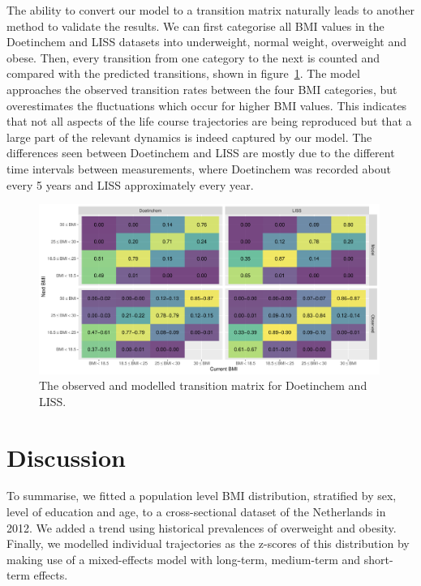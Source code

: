 \documentclass{imammb}
\numberwithin{equation}{section}
\begin{document}
The ability to convert our model to a transition matrix naturally leads to another method to validate the results. We can first categorise all BMI values in the Doetinchem and LISS datasets into underweight, normal weight, overweight and obese. Then, every transition from one category to the next is counted and compared with the predicted transitions, shown in figure~\ref{fig:Transition Matrices}. The model approaches the observed transition rates between the four BMI categories, but overestimates the fluctuations which occur for higher BMI values. This indicates that not all aspects of the life course trajectories are being reproduced but that a large part of the relevant dynamics is indeed captured by our model. The differences seen between Doetinchem and LISS are mostly due to the different time intervals between measurements, where Doetinchem was recorded about every 5 years and LISS approximately every year.

\vspace{-4mm}

\begin{figure}[!h]
\centering\includegraphics[width=0.99\textwidth] {"Figures/Transition Matrices.pdf"}
\caption{The observed and modelled transition matrix for Doetinchem and LISS.}
\label{fig:Transition Matrices}
\vspace*{-9pt}
\end{figure}

\section{Discussion}
\label{sec:Discussion}

To summarise, we fitted a population level BMI distribution, stratified by sex, level of education and age, to a cross-sectional dataset of the Netherlands in 2012. We added a trend using historical prevalences of overweight and obesity. Finally, we modelled individual trajectories as the z-scores of this distribution by making use of a mixed-effects model with long-term, medium-term and short-term effects.
\end{document}
